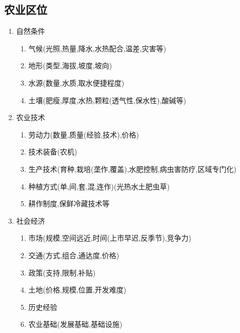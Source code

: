 \documentclass[a4paper]{article}
\begin{document}
    \subsection{农业区位}
    \begin{enumerate}
        \item 自然条件
        \begin{enumerate}
            \item 气候(光照,热量,降水,水热配合,温差,灾害等)
            \item 地形(类型,海拔,坡度,坡向)
            \item 水源(数量,水质,取水便捷程度)
            \item 土壤(肥瘦,厚度,水热,颗粒(透气性,保水性),酸碱等)
        \end{enumerate}
        \item 农业技术
        \begin{enumerate}
            \item 劳动力(数量,质量(经验,技术),价格)
            \item 技术装备(农机)
            \item 生产技术(育种,栽培(垄作,覆盖),水肥控制,病虫害防疗,区域专门化)
            \item 种植方式(单,间,套,混,连作)(光热水土肥虫草)
            \item 耕作制度,保鲜冷藏技术等
        \end{enumerate}
        \item 社会经济
        \begin{enumerate}
            \item 市场(规模,空间远近,时间(上市早迟,反季节),竞争力)
            \item 交通(方式,组合,通达度,价格)
            \item 政策(支持,限制,补贴)
            \item 土地(价格,规模,位置,开发难度)
            \item 历史经验
            \item 农业基础(发展基础,基础设施)
        \end{enumerate}
    \end{enumerate}
\end{document}
